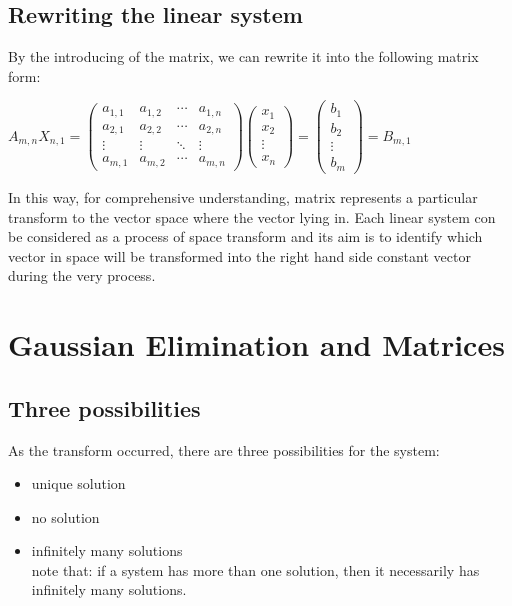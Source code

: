 \documentclass[UTF8,a4paper, 10pt, openany]{book}
\begin{document}
\subsection{Rewriting the linear system}
By the introducing of the matrix, we can rewrite it into the following matrix form:
\begin{center}
$A_{m,n}X_{n,1}= 
 \begin{pmatrix}
  a_{1,1} & a_{1,2} & \cdots & a_{1,n} \\
  a_{2,1} & a_{2,2} & \cdots & a_{2,n} \\
  \vdots  & \vdots  & \ddots & \vdots  \\
  a_{m,1} & a_{m,2} & \cdots & a_{m,n} 
 \end{pmatrix} 
 \begin{pmatrix}
  x_{1}\\
  x_{2}\\
  \vdots \\
  x_{n} 
 \end{pmatrix}=
 \begin{pmatrix}
  b_{1}\\
  b_{2}\\
  \vdots \\
  b_{m} 
 \end{pmatrix}
 =B_{m,1}$
\end{center}
In this way, for comprehensive understanding, matrix represents a particular transform to the vector space where the vector lying in. Each linear system con be considered as a process of space transform and its aim is to identify which vector in space will be transformed into the right hand side constant vector during the very process.

\section{Gaussian Elimination and Matrices}
\subsection{Three possibilities}
As the transform occurred, there are three possibilities for the system:
\begin{itemize}
\item{unique solution}
\item{no solution}
\item{infinitely many solutions}
\\note that: if a system has more than one solution, then it necessarily has infinitely many solutions.
\end{itemize}
\end{document}

